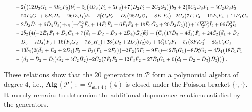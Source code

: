 \documentclass[10pt]{amsart}
\theoremstyle{definition}
\theoremstyle{corollary}
\theoremstyle{remark}
\theoremstyle{conclusion}
\begin{document}
\begin{align}
& \hskip 0.7cm+2 \bigl(\bigl(12 \bar{D}_3 \bar{G}_1-8 \bar{E}_1 \bar{F}_3\bigl) \bar{b}_3^2-\bar{c}_1 \bigl(4 \bar{D}_3 \bigl(\bar{F}_1+5 \bar{F}_3\bigl)+7 \bigl(\bar{D}_2 \bar{F}_3+2 \bar{C}_2 \bar{G}_2\bigl)\bigl) \bar{b}_3+2 \bigl(9 \bar{C}_2 \bar{D}_3 \bar{F}_1-3 \bar{C}_2 \bar{D}_3 \bar{F}_3\nonumber \\
& \hskip 0.7cm-20 \bar{F}_4 \bar{G}_1+8 \bar{E}_1 \bar{H}_2+26 \bar{D}_3 \bar{I}_1\bigl) \bar{b}_3+\bar{c}_1^2 \bar{C}_2 \bar{F}_3+\bar{D}_4 \bigl(28 \bar{D}_3 \bar{G}_1-8 \bar{E}_1 \bar{F}_3\bigl)-2 \bar{C}_2 \bigl(7 \bar{F}_1 \bar{F}_4-12 \bar{F}_3 \bar{F}_4+11 \bar{E}_1 \bar{G}_2\nonumber \\
& \hskip 0.7cm-2 \bar{D}_3 \bar{H}_1+6 \bar{D}_3 \bar{H}_2\bigl)+\bar{c}_1 \bigl(-\bar{C}_2^2 \bar{F}_3+14 \bar{F}_1 \bar{F}_4-6 \bar{F}_3 \bar{F}_4+18 \bar{E}_1 \bar{G}_2+20 \bar{D}_3 \bar{H}_2\bigl)\bigl)\bigl)+16 \bar{b}_2^2 \bar{b}_3^2 \bar{I}_2+96 \bar{D}_3^2 \bar{I}_2\nonumber \\
& \hskip 0.7cm-2 \bar{b}_2 \bigl(4 \bigl(-2 \bar{E}_1 \bar{F}_1+\bar{D}_2 \bar{G}_1+7 \bigl(\bar{d}_1+\bar{D}_2-\bar{D}_3+2 \bar{D}_4\bigl) \bar{G}_2\bigl) \bar{b}_3^2+\bigl(\bar{C}_2 \bigl(17 \bar{D}_3-4 \bar{d}_1\bigl) \bar{F}_1+24 \bar{C}_2 \bigl(\bar{d}_1+\bar{D}_2\nonumber \\
& \hskip 0.7cm-\bar{D}_3+2 \bar{D}_4\bigl) \bar{F}_3+16 \bigl(\bar{F}_2 \bar{G}_2-7 \bar{E}_1 \bar{H}_1\bigl)+28 \bigl(\bar{D}_2+2 \bar{D}_3\bigl) \bar{I}_2\bigl) \bar{b}_3+3 \bar{c}_1^2 \bar{C}_2 \bar{F}_1-\bar{c}_1 \bigl(3 \bar{F}_1 \bar{C}_2^2-8 \bar{b}_3 \bar{C}_2 \bar{G}_1\nonumber  \\
& \hskip 0.7cm+13 \bar{b}_3 \bigl(2 \bigl(\bar{d}_1+\bar{D}_2+2 \bar{D}_4\bigl) \bar{F}_3+\bar{D}_3 \bigl(\bar{F}_1-2 \bar{F}_3\bigl)\bigl)+2 \bar{F}_2 \bigl(5 \bar{F}_1-9 \bar{F}_3\bigl)-42 \bar{E}_1 \bar{G}_1\bigl)-8 \bar{D}_4^2 \bar{G}_2+4 \bar{D}_4 \bigl(18 \bar{E}_1 \bar{F}_1\nonumber \\
& \hskip 0.7cm-\bigl(\bar{d}_1+\bar{D}_2-\bar{D}_3\bigl) \bar{G}_2+6 \bar{C}_2 \bar{H}_2\bigl)+2 \bar{C}_2 \bigl(7 \bar{F}_1 \bar{F}_2-12 \bar{F}_3 \bar{F}_2-27 \bar{E}_1 \bar{G}_1+6 \bigl(\bar{d}_1+\bar{D}_2-\bar{D}_3\bigl) \bar{H}_2\bigl)\bigl)\bigl) \, .
\end{align}

\noindent  These relations show that the $20$ generators in $\mathcal{P}$ form a polynomial algebra of degree $4$, i.e., $\textbf{Alg} \left\langle \mathcal{P} \right \rangle: = \mathcal{Q}_{\mathfrak{su}(4)}(4)$ is closed under the Poisson bracket $\{\cdot,\cdot\}.$   It merely remains to determine the additional dependence relations satisfied by the generators.
\end{document}
